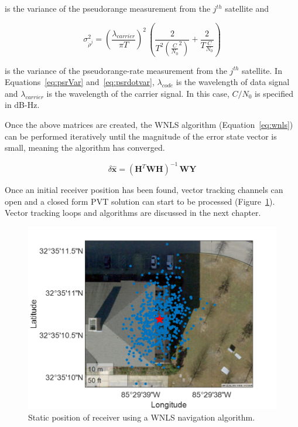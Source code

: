 is the variance of the pseudorange measurement from the \(j^{th}\) satellite and

\begin{equation}\label{eq:psrdotvar}
    \sigma^2_{\dot{\rho}^j} = {\left(\frac{\lambda_{carrier}}{\pi T}\right)}^2\,{\left(\frac{2}{T^2{\left(\frac{C}{N_0}^2\right)}} + \frac{2}{T \frac{C}{N_0}}\right)}
\end{equation}

is the variance of the pseudorange-rate measurement from the \(j^{th}\) satellite. In Equations~\ref{eq:psrVar} and~\ref{eq:psrdotvar}, \(\lambda_{code}\) is the wavelength of data signal and \(\lambda_{carrier}\) is the wavelength of the carrier signal. In this case, \(C/N_0\) is specified in dB-Hz.

Once the above matrices are created, the WNLS algorithm (Equation~\ref{eq:wnls}) can be performed iteratively until the magnitude of the error state vector is small, meaning the algorithm has converged.

\begin{equation}\label{eq:wnls}
    \delta\hat{\mathbf{x}} = {{\left(\mathbf{H}^{T}\mathbf{W}\mathbf{H}\right)}^{-1}\,\mathbf{W}\mathbf{Y}}
\end{equation}

Once an initial receiver position has been found, vector tracking channels can open and a closed form PVT solution can start to be processed (Figure~\ref{fig:WNLS}). Vector tracking loops and algorithms are discussed in the next chapter.

\begin{figure}[!ht]
\centering
\includegraphics[width=\linewidth]{Figures/WNLS.png}
\caption{Static position of receiver using a WNLS navigation algorithm.}\label{fig:WNLS}
\end{figure}

